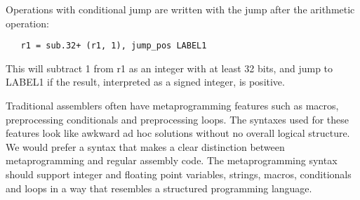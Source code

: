 \documentclass[forwardcom.tex]{subfiles}
\begin{document}
\vspace{2mm}
Operations with conditional jump are written with the jump after the arithmetic operation:
\begin{lstlisting}
   r1 = sub.32+ (r1, 1), jump_pos LABEL1
\end{lstlisting}
This will subtract 1 from r1 as an integer with at least 32 bits, and jump to LABEL1 if the result, interpreted as a signed integer, is positive.

\vspace{2mm}
Traditional assemblers often have metaprogramming features such as macros, preprocessing conditionals and preprocessing loops. The syntaxes used for these features look like awkward ad hoc solutions without no overall logical structure. We would prefer a syntax that makes a clear distinction between metaprogramming and regular assembly code. The metaprogramming syntax should support integer and floating point variables, strings, macros, conditionals and loops in a way that resembles a structured programming language. 
\end{document}
